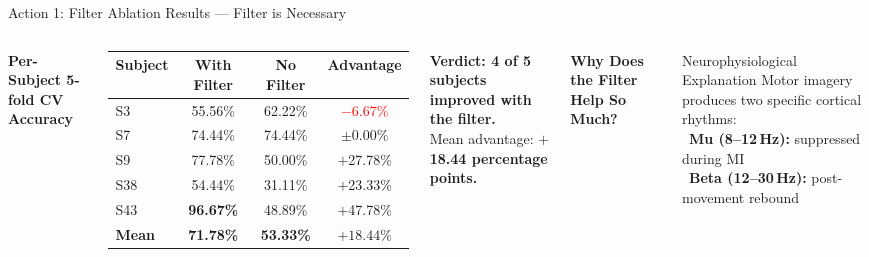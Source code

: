\documentclass[aspectratio=169, 11pt]{beamer}
\begin{document}
\begin{frame}{Action 1: Filter Ablation Results --- Filter is Necessary}

    \begin{columns}[T]
        \textbf{Per-Subject 5-fold CV Accuracy}

        \vspace{2mm}
        \begin{table}
            \centering
            \small
            \begin{tabular}{lccc}
                \toprule
                Subject & With Filter & No Filter & Advantage \\
                \midrule
                S3  & 55.56\% & 62.22\% & \textcolor{red}{$-$6.67\%} \\
                S7  & 74.44\% & 74.44\% & $\pm$0.00\% \\
                S9  & 77.78\% & 50.00\% & \textcolor{completed}{$+$27.78\%} \\
                S38 & 54.44\% & 31.11\% & \textcolor{completed}{$+$23.33\%} \\
                S43 & \textbf{96.67\%} & 48.89\% & \textcolor{completed}{$+$47.78\%} \\
                \midrule
                \textbf{Mean} & \textbf{71.78\%} & \textbf{53.33\%} & \textcolor{completed}{$\mathbf{+18.44\%}$} \\
                \bottomrule
            \end{tabular}
        \end{table}

        \vspace{3mm}
        \textbf{Verdict: 4 of 5 subjects improved with the filter.}\\
        Mean advantage: \textbf{$+$18.44 percentage points.}

        \textbf{Why Does the Filter Help So Much?}

        \vspace{3mm}
        \begin{exampleblock}{Neurophysiological Explanation}
            Motor imagery produces two specific cortical rhythms:\\
            \textbullet\ \textbf{Mu (8--12\,Hz):} suppressed during MI\\
            \textbullet\ \textbf{Beta (12--30\,Hz):} post-movement rebound
        \end{exampleblock}


\end{columns}
\end{frame}
\end{document}
